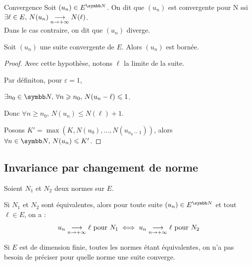 \begin{definition}{Convergence}{}
    Soit $(u_n) \in E^{\N}$. On dit que $(u_n)$ est convergente pour N ssi 
    $\exists \ell \in E, \, N(u_n) \underset{n \to +\infty}{\longrightarrow} N(\ell)$. \\

    Dans le cas contraire, on dit que $(u_n)$ diverge.
\end{definition}

\begin{definition}{}{}
    Soit $(u_n)$ une suite convergente de $E$. Alors $(u_n)$ est bornée.
\end{definition}


\begin{proof}
    Avec cette hypothèse, notons $\ell$ la limite de la suite. 

    Par définiton, pour $\varepsilon = 1$,
    
    $\exists n_0 \in \N, \, \forall n \geqslant n_0, \, N(u_n - \ell) \leqslant 1$.

    Donc $\forall n \geqslant n_0, \, N(u_n) \leqslant N(\ell) + 1$.

    Posons $K' = \max(K, N(u_0), \ldots, N(u_{n_0 - 1}))$, alors $\forall n \in \N, \, N(u_n) \leqslant K'$.
\end{proof}

\subsection{Invariance par changement de norme}

\begin{theoreme}{}{}
    Soient $N_1$ et $N_2$ deux normes sur $E$. 

    Si $N_1$ et $N_2$ sont équivalentes, alors pour toute suite $(u_n) \in E^{\N}$ 
    et tout $\ell \in E$, on a :
    \[u_n \underset{n \to +\infty}{\longrightarrow} \ell \text{ pour } N_1 \iff u_n \underset{n \to +\infty}{\longrightarrow} \ell \text{ pour } N_2\]
\end{theoreme}

\begin{remarque}
    Si $E$ est de dimension finie, toutes les normes étant équivalentes, on n'a pas besoin de préciser pour quelle norme une suite converge.
\end{remarque}


